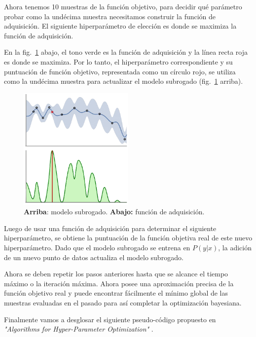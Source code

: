 \documentclass[a4paper,12pt]{article}
\begin{document}
Ahora tenemos 10 muestras de la función objetivo, para decidir qué parámetro probar como la undécima muestra necesitamos construir la función de adquisición. El siguiente hiperparámetro de elección es donde se maximiza la función de adquisición.

En la fig.~\ref{fig:bayes9} abajo, el tono verde es la función de adquisición y la línea recta roja es donde se maximiza. Por lo tanto, el hiperparámetro correspondiente y su puntuación de función objetivo, representada como un círculo rojo, se utiliza como la undécima muestra para actualizar el modelo subrogado (fig.~\ref{fig:bayes9} arriba).

\begin{figure}[H]
	\begin{center}
	\includegraphics[width=0.50\textwidth]{bayes_opt_9.png}
  	\caption{\textbf{Arriba}: modelo subrogado. \textbf{Abajo:} función de adquisición.}
  	\label{fig:bayes9}
  	\end{center}
\end{figure}

Luego de usar una función de adquisición para determinar el siguiente hiperparámetro, se obtiene la puntuación de la función objetiva real de este nuevo hiperparámetro. Dado que el modelo subrogado se entrena en $P(y|x)$, la adición de un nuevo punto de datos actualiza el modelo subrogado.

Ahora se deben repetir los pasos anteriores hasta que se alcance el tiempo máximo o la iteración máxima. Ahora posee una aproximación precisa de la función objetivo real y puede encontrar fácilmente el mínimo global de las muestras evaluadas en el pasado para así completar la optimización bayesiana.

Finalmente vamos a desglosar el siguiente pseudo-código propuesto en \textit{"Algorithms for Hyper-Parameter Optimization"} \citep{smbo}.
\end{document}
